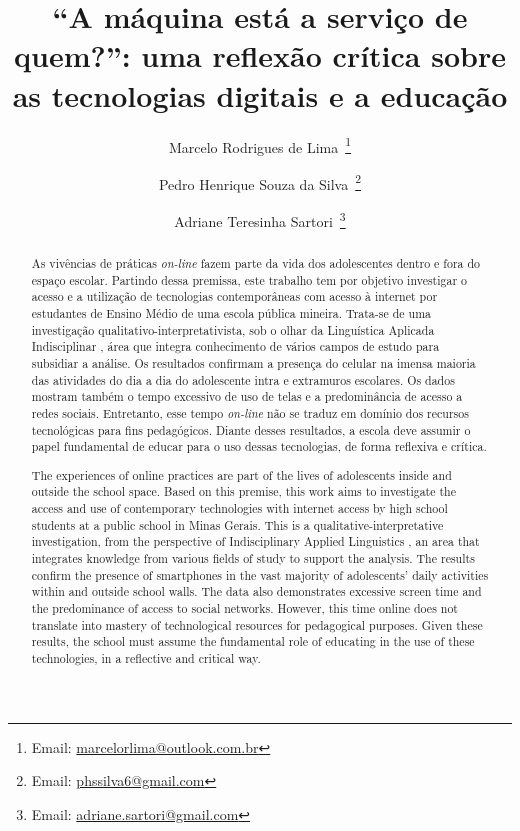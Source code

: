 \documentclass[portuguese]{textolivre}
\title{``A máquina está a serviço de quem?'': uma reflexão crítica sobre as tecnologias digitais e a educação}
\author[1]{Marcelo Rodrigues de Lima~\orcid{0000-0001-7318-9148}\thanks{Email: \href{mailto:marcelorlima@outlook.com.br}{marcelorlima@outlook.com.br}}}
\author[1]{Pedro Henrique Souza da Silva~\orcid{0009-0006-1532-9839}\thanks{Email: \href{mailto:phssilva6@gmail.com}{phssilva6@gmail.com}}}
\author[1]{Adriane Teresinha Sartori~\orcid{0000-0002-9536-3642}\thanks{Email: \href{mailto:adriane.sartori@gmail.com}{adriane.sartori@gmail.com}}}
\affil[1]{Universidade Federal de Minas Gerais, Faculdade de Letras, Programa de Pós-Graduação em Estudos Linguísticos, Belo Horizonte, MG, Brasil.}
\begin{document}
\maketitle
\begin{polyabstract}
\begin{abstract}
As vivências de práticas \textit{on-line} fazem parte da vida dos adolescentes dentro e fora do espaço escolar. Partindo dessa premissa, este trabalho tem por objetivo investigar o acesso e a utilização de tecnologias contemporâneas com acesso à internet por estudantes de Ensino Médio de uma escola pública mineira. Trata-se de uma investigação qualitativo-interpretativista, sob o olhar da Linguística Aplicada Indisciplinar \cite{moita_lopes_por_2006}, área que integra conhecimento de vários campos de estudo para subsidiar a análise. Os resultados confirmam a presença do celular na imensa maioria das atividades do dia a dia do adolescente intra e extramuros escolares. Os dados mostram também o tempo excessivo de uso de telas e a predominância de acesso a redes sociais. Entretanto, esse tempo \textit{on-line} não se traduz em domínio dos recursos tecnológicas para fins pedagógicos. Diante desses resultados, a escola deve assumir o papel fundamental de educar para o uso dessas tecnologias, de forma reflexiva e crítica. 

\end{abstract}

\begin{english}
\begin{abstract}
The experiences of online practices are part of the lives of adolescents inside and outside the school space. Based on this premise, this work aims to investigate the access and use of contemporary technologies with internet access by high school students at a public school in Minas Gerais. This is a qualitative-interpretative investigation, from the perspective of Indisciplinary Applied Linguistics \cite{moita_lopes_por_2006}, an area that integrates knowledge from various fields of study to support the analysis. The results confirm the presence of smartphones in the vast majority of adolescents' daily activities within and outside school walls. The data also demonstrates excessive screen time and the predominance of access to social networks. However, this time online does not translate into mastery of technological resources for pedagogical purposes. Given these results, the school must assume the fundamental role of educating in the use of these technologies, in a reflective and critical way.

\end{abstract}
\end{english}
\end{polyabstract}
\end{document}
